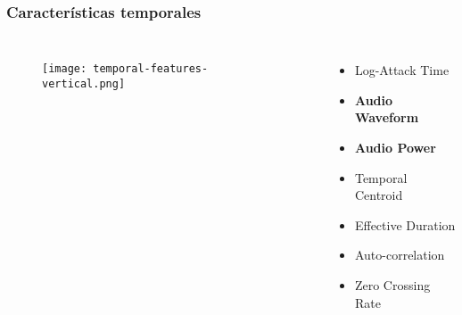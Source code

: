 \begin{frame}
    \frametitle{Características temporales}

    \begin{columns}

        \begin{figure}[!h]
            \centering
            \texttt{[image: temporal-features-vertical.png]}
        \end{figure}


        \begin{itemize}
            \item<2-> Log-Attack Time
            \item<3-> \textbf{Audio Waveform}
            \item<4-> \textbf{Audio Power}
            \item<5-> Temporal Centroid
            \item<6-> Effective Duration
            \item<7-> Auto-correlation
            \item<8-> Zero Crossing Rate
        \end{itemize}

    \end{columns}
\end{frame}

